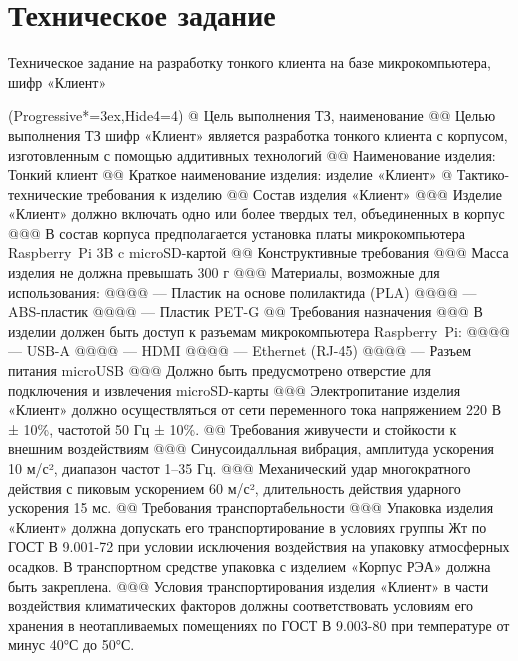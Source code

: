 \section{Техническое задание}

Техническое задание на разработку тонкого клиента на базе микрокомпьютера, шифр «Клиент»

\begin{easylist}[articletoc]
\ListProperties(Progressive*=3ex,Hide4=4)
@ Цель выполнения ТЗ, наименование
@@ Целью выполнения ТЗ шифр «Клиент» является разработка тонкого клиента с корпусом,
изготовленным с помощью аддитивных технологий
@@ Наименование изделия: Тонкий клиент
@@ Краткое наименование изделия: изделие «Клиент»
@ Тактико-технические требования к изделию
@@ Состав изделия «Клиент»
@@@ Изделие «Клиент» должно включать одно или более твердых тел, объединенных в корпус
@@@ В состав корпуса предполагается установка платы микрокомпьютера Raspberry~Pi 3B c
microSD-картой
@@ Конструктивные требования
@@@ Масса изделия не должна превышать 300 г
@@@ Материалы, возможные для использования: 
@@@@ — Пластик на основе полилактида (PLA)
@@@@ — ABS-пластик
@@@@ — Пластик PET-G
@@ Требования назначения
@@@ В изделии должен быть доступ к разъемам микрокомпьютера Raspberry~Pi:
@@@@ — USB-A
@@@@ — HDMI
@@@@ — Ethernet (RJ-45)
@@@@ — Разъем питания microUSB
@@@ Должно быть предусмотрено отверстие для подключения и извлечения microSD-карты
@@@ Электропитание изделия «Клиент» должно осуществляться от сети
переменного тока напряжением 220 В ± 10\%, частотой 50 Гц ± 10\%.
@@ Требования живучести и стойкости к внешним воздействиям
@@@ Синусоидалльная вибрация, амплитуда ускорения 10 м/с², диапазон частот 1–35 Гц.
@@@ Механический удар многократного действия с пиковым ускорением 60 м/с², длительность
действия ударного ускорения 15 мс.
@@ Требования транспортабельности
@@@ Упаковка изделия «Клиент» должна допускать его транспортирование
в условиях группы Жт по ГОСТ В 9.001-72 при условии исключения воздействия
на упаковку атмосферных осадков. В транспортном средстве упаковка с
изделием «Корпус РЭА» должна быть закреплена.
@@@ Условия транспортирования изделия «Клиент» в части воздействия
климатических факторов должны соответствовать условиям его хранения в
неотапливаемых помещениях по ГОСТ В 9.003-80 при температуре от минус
40°С до 50°С.
\end{easylist}

